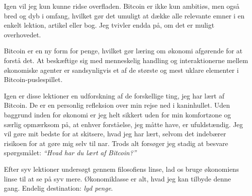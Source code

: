 Igen vil jeg kun kunne ridse overfladen. Bitcoin er ikke kun ambitiøs, men også 
bred og dyb i omfang, hvilket gør det umuligt at dække alle relevante emner i en 
enkelt lektion, artikel eller bog. Jeg tvivler endda på, om det er muligt 
overhovedet.

Bitcoin er en ny form for penge, hvilket gør læring om økonomi afgørende for at 
forstå det. At beskæftige sig med menneskelig handling og interaktionerne mellem 
økonomiske agenter er sandsynligvis et af de største og mest uklare elementer i 
Bitcoin-puslespillet.

Igen er disse lektioner en udforskning af de forskellige ting, jeg har lært af 
Bitcoin. De er en personlig refleksion over min rejse ned i kaninhullet. Uden 
baggrund inden for økonomi er jeg helt sikkert uden for min komfortzone og 
særlig opmærksom på, at enhver forståelse, jeg måtte have, er ufuldstændig. Jeg 
vil gøre mit bedste for at skitsere, hvad jeg har lært, selvom det indebærer 
risikoen for at gøre mig selv til nar. Trods alt forsøger jeg stadig at besvare 
spørgsmålet: \textit{\enquote{Hvad har du lært af Bitcoin?}}

Efter syv lektioner undersøgt gennem filosofiens linse, lad os bruge økonomiens 
linse til at se på syv mere. Økonomiklasse er alt, hvad jeg kan tilbyde denne 
gang. Endelig destination: \textit{lyd penge}.

